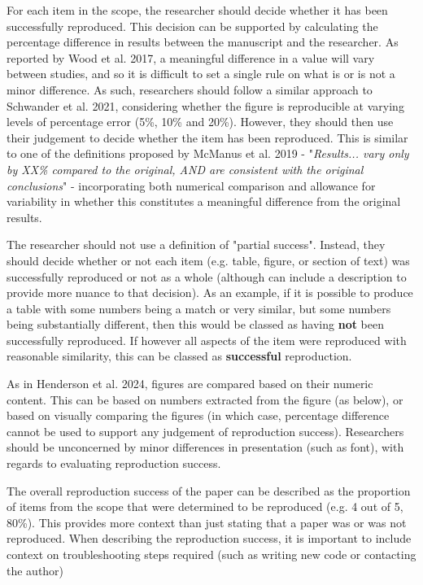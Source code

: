 For each item in the scope, the researcher should decide whether it has been successfully reproduced. This decision can be supported by calculating the percentage difference in results between the manuscript and the researcher. As reported by Wood et al. 2017,\autocite{wood_push_2018, wood_replication_2018} a meaningful difference in a value will vary between studies, and so it is difficult to set a single rule on what is or is not a minor difference. As such, researchers should follow a similar approach to Schwander et al. 2021,\autocite{schwander_replication_2021} considering whether the figure is reproducible at varying levels of percentage error (5\%, 10\% and 20\%). However, they should then use their judgement to decide whether the item has been reproduced. This is similar to one of the definitions proposed by McManus et al. 2019\autocite{mcmanus_can_2019} - "\textit{Results... vary only by XX\% compared to the original, AND are consistent with the original conclusions}" - incorporating both numerical comparison and allowance for variability in whether this constitutes a meaningful difference from the original results.

The researcher should not use a definition of "partial success". Instead, they should decide whether or not each item (e.g. table, figure, or section of text) was successfully reproduced or not as a whole (although can include a description to provide more nuance to that decision). As an example, if it is possible to produce a table with some numbers being a match or very similar, but some numbers being substantially different, then this would be classed as having \textbf{not} been successfully reproduced. If however all aspects of the item were reproduced with reasonable similarity, this can be classed as \textbf{successful} reproduction.

As in Henderson et al. 2024,\autocite{henderson_reproducibility_2024} figures are compared based on their numeric content. This can be based on numbers extracted from the figure (as below), or based on visually comparing the figures (in which case, percentage difference cannot be used to support any judgement of reproduction success). Researchers should be unconcerned by minor differences in presentation (such as font), with regards to evaluating reproduction success.

The overall reproduction success of the paper can be described as the proportion of items from the scope that were determined to be reproduced (e.g. 4 out of 5, 80\%). This provides more context than just stating that a paper was or was not reproduced. When describing the reproduction success, it is important to include context on troubleshooting steps required (such as writing new code or contacting the author)

